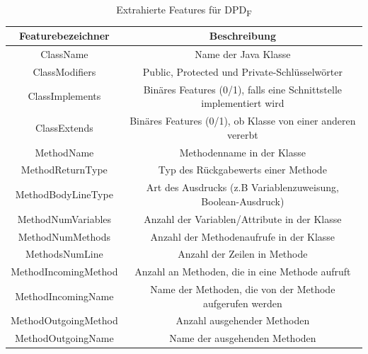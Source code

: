 \begin{table}[H]
    \begin{tabular}{|c|c|}
        \hline
        Featurebezeichner & Beschreibung\\
        \hline
        ClassName & Name der Java Klasse\\
        ClassModifiers & Public, Protected und Private-Schlüsselwörter\\
        ClassImplements & Binäres Features (0/1), falls eine Schnittstelle implementiert wird\\ 
        ClassExtends & Binäres Features (0/1), ob Klasse von einer anderen vererbt\\
        MethodName & Methodenname in der Klasse\\
        MethodReturnType & Typ des Rückgabewerts einer Methode\\
        MethodBodyLineType & Art des Ausdrucks (z.B Variablenzuweisung, Boolean-Ausdruck)\\
        MethodNumVariables & Anzahl der Variablen/Attribute in der Klasse\\
        MethodNumMethods & Anzahl der Methodenaufrufe in der Klasse\\
        MethodsNumLine & Anzahl der Zeilen in Methode\\
        MethodIncomingMethod & Anzahl an Methoden, die in eine Methode aufruft\\
        MethodIncomingName & Name der Methoden, die von der Methode aufgerufen werden\\
        MethodOutgoingMethod & Anzahl ausgehender Methoden\\
        MethodOutgoingName & Name der ausgehenden Methoden\\
        \hline  
    \end{tabular}
    \caption{Extrahierte Features für DPD\textsubscript{F}}
    \label{table:dpdf_features}
\end{table}

